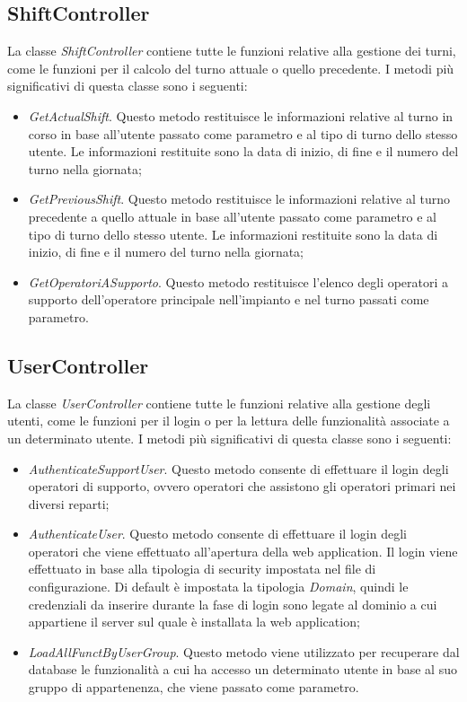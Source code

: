   \subsection{ShiftController}
  La classe \textit{ShiftController} contiene tutte le funzioni relative alla gestione dei turni,
  come le funzioni per il calcolo del turno attuale o quello precedente. I metodi più significativi
  di questa classe sono i seguenti:
  \begin{itemize}
    \item \textit{GetActualShift}. Questo metodo restituisce le informazioni relative al turno in corso in base
    all'utente passato come parametro e al tipo di turno dello stesso utente. Le informazioni restituite sono
    la data di inizio, di fine e il numero del turno nella giornata;
    \item \textit{GetPreviousShift}. Questo metodo restituisce le informazioni relative al turno precedente a
    quello attuale in base all'utente passato come parametro e al tipo di turno dello stesso utente. Le informazioni
    restituite sono la data di inizio, di fine e il numero del turno nella giornata;
    \item \textit{GetOperatoriASupporto}. Questo metodo restituisce l'elenco degli operatori a supporto dell'operatore
    principale nell'impianto e nel turno passati come parametro.
  \end{itemize}

  \subsection{UserController}
  La classe \textit{UserController} contiene tutte le funzioni relative alla gestione degli utenti,
  come le funzioni per il login o per la lettura delle funzionalità associate a un determinato utente. I metodi più significativi
  di questa classe sono i seguenti:
  \begin{itemize}
    \item \textit{AuthenticateSupportUser}. Questo metodo consente di effettuare il login degli operatori di supporto,
    ovvero operatori che assistono gli operatori primari nei diversi reparti;
    \item \textit{AuthenticateUser}. Questo metodo consente di effettuare il login degli operatori che viene effettuato
    all'apertura della web application. Il login viene effettuato in base alla tipologia di security impostata nel
    file di configurazione. Di default è impostata la tipologia \textit{Domain}, quindi le credenziali da inserire
    durante la fase di login sono legate al dominio a cui appartiene il server sul quale è installata la web application;
    \item \textit{LoadAllFunctByUserGroup}. Questo metodo viene utilizzato per recuperare dal database le funzionalità
    a cui ha accesso un determinato utente in base al suo gruppo di appartenenza, che viene passato come parametro.    
  \end{itemize}